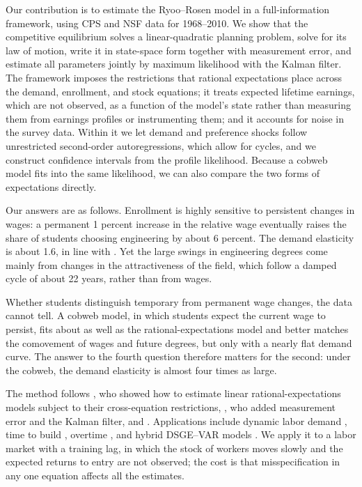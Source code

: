 \documentclass[12pt]{article}
\begin{document}
Our contribution is to estimate the Ryoo--Rosen model in a full-information framework, using CPS and NSF data for 1968--2010. We show that the competitive equilibrium solves a linear-quadratic planning problem, solve for its law of motion, write it in state-space form together with measurement error, and estimate all parameters jointly by maximum likelihood with the Kalman filter. The framework imposes the restrictions that rational expectations place across the demand, enrollment, and stock equations; it treats expected lifetime earnings, which are not observed, as a function of the model's state rather than measuring them from earnings profiles or instrumenting them; and it accounts for noise in the survey data. Within it we let demand and preference shocks follow unrestricted second-order autoregressions, which allow for cycles, and we construct confidence intervals from the profile likelihood. Because a cobweb model fits into the same likelihood, we can also compare the two forms of expectations directly.

Our answers are as follows. Enrollment is highly sensitive to persistent changes in wages: a permanent 1 percent increase in the relative wage eventually raises the share of students choosing engineering by about 6 percent. The demand elasticity is about 1.6, in line with \citet{ryoo2004engineering}. Yet the large swings in engineering degrees come mainly from changes in the attractiveness of the field, which follow a damped cycle of about 22 years, rather than from wages.

Whether students distinguish temporary from permanent wage changes, the data cannot tell. A cobweb model, in which students expect the current wage to persist, fits about as well as the rational-expectations model and better matches the comovement of wages and future degrees, but only with a nearly flat demand curve. The answer to the fourth question therefore matters for the second: under the cobweb, the demand elasticity is almost four times as large.

The method follows \citet{hansen1980formulating}, who showed how to estimate linear rational-expectations models subject to their cross-equation restrictions, \citet{sargent1989two}, who added measurement error and the Kalman filter, and \citet{hansen2013recursive}. Applications include dynamic labor demand \citep{sargent1978estimation}, time to build \citep{altug1989time}, overtime \citep{hall1996overtime}, and hybrid DSGE--VAR models \citep{ireland2004method}. We apply it to a labor market with a training lag, in which the stock of workers moves slowly and the expected returns to entry are not observed; the cost is that misspecification in any one equation affects all the estimates.
\end{document}
